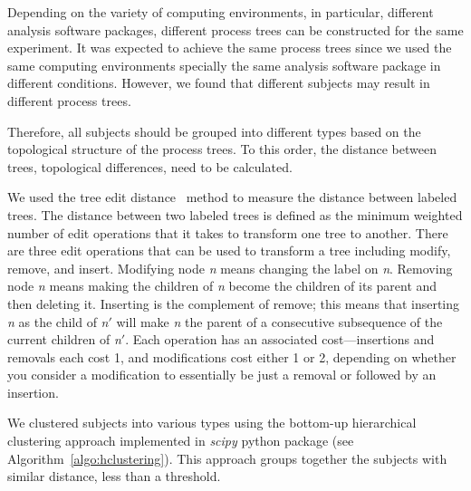 \documentclass[a4paper,num-refs]{oup-contemporary}
\begin{document}
Depending on the variety of computing environments, in particular, 
different analysis software packages, different process trees can be 
constructed for the same experiment. It was expected to achieve the 
same process trees since we used the same computing environments 
specially the same analysis software package in different conditions. 
However, we found that different subjects may result in different 
process trees. 

Therefore, all subjects should be grouped into different types based on 
the topological structure of the process trees.
To this order, the distance between trees, topological differences, 
need to be calculated.

We used the tree edit distance~\cite{zhang1989simple} method to measure 
the distance between labeled trees. The distance between two labeled 
trees is defined as the minimum weighted number of edit operations that 
it takes to transform one tree to another. There are three edit 
operations that can be used to transform a tree including modify, 
remove, and insert. Modifying node \textit{n} means changing the label 
on \textit{n}. Removing node \textit{n} means making the children of 
\textit{n} become the children of its parent and then 
deleting it. Inserting is the complement of remove; this 
means that inserting \textit{n} as the child of \textit{n}$'$ will make 
\textit{n} the parent of a consecutive subsequence of the current 
children of \textit{n}$'$.
Each operation has an associated cost---insertions and removals each 
cost 1, and modifications cost either 1 or 2, depending on whether 
you consider a modification to essentially be just a removal 
or followed by an insertion.

We clustered subjects into various types using the bottom-up hierarchical 
clustering approach implemented in \textit{scipy} python package (see 
Algorithm~\ref{algo:hclustering}). This approach groups together the 
subjects with similar distance, less than a threshold. 

  
\end{document}

